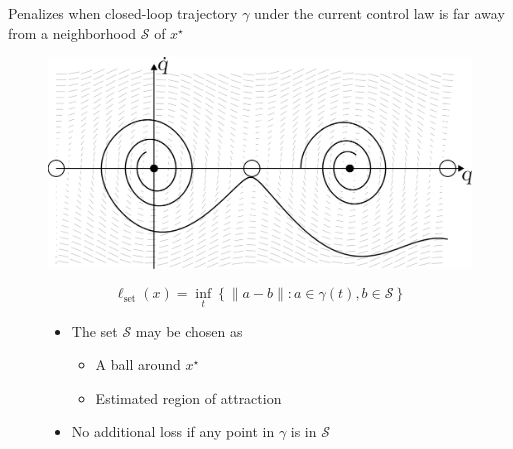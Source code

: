 \documentclass[
]{report}
\providecommand{\tightlist}{%
  \setlength{\itemsep}{0pt}\setlength{\parskip}{0pt}}\usepackage{longtable,booktabs,array}
\begin{document}
\begin{tcolorbox}[enhanced jigsaw, bottomrule=.15mm, arc=.35mm, colframe=quarto-callout-color-frame, breakable, leftrule=.75mm, rightrule=.15mm, colback=white, toprule=.15mm, left=2mm, opacityback=0]

Penalizes when closed-loop trajectory \(\gamma\) under the current
control law is far away from a neighborhood \(\mathcal{S}\) of
\(x^\star\)

\begin{figure}

\begin{minipage}[t]{0.50\linewidth}

{\centering 

\includegraphics{contents/assets/pend_damped_phase_edited.svg}

}

\end{minipage}%
%
\begin{minipage}[t]{0.50\linewidth}

{\centering 

\[
\ell_{\text{set}}(x) = \underset{t}{\inf} \left\{ \lVert a-b \rVert : a \in \gamma(t), b \in \mathcal{S}\right\}
\]

\begin{itemize}
\tightlist
\item
  The set \(\mathcal{S}\) may be chosen as

  \begin{itemize}
  \tightlist
  \item
    A ball around \(x^\star\)
  \item
    Estimated region of attraction
  \end{itemize}
\item
  No additional loss if any point in \(\gamma\) is in \(\mathcal{S}\)
\end{itemize}

}

\end{minipage}%

\end{figure}

\end{tcolorbox}
\end{document}
